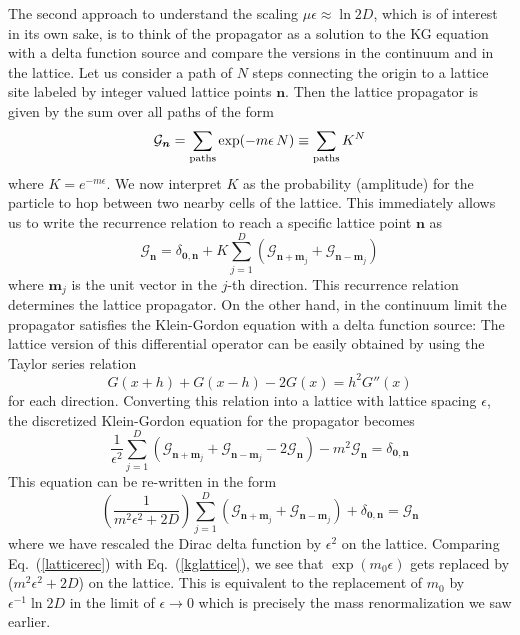 \documentclass[12pt]{article}
\def\eq#1{{Eq.~(\ref{#1})}}
\begin{document}
The second approach to understand the scaling $\mu\epsilon \approx \ln 2D$, which is of interest in its own sake, is to think of the propagator as a solution to the KG equation with a delta function source and compare the versions in the continuum and in the lattice.
 Let us consider a path of $N$ steps connecting the origin to a lattice site labeled by integer valued lattice points $\bm{n}$. Then the lattice propagator is given by the sum over all paths of the form
\begin{equation}
 \mathcal{G}_{\bm{n}} = \sum_{\rm paths} \exp(-m\epsilon \, N) \equiv \sum_{\rm paths} K^N
\end{equation} 
where $K = e^{-m\epsilon }$. We now interpret $K$ as the probability (amplitude) for the particle to hop between two nearby cells of the lattice. This immediately allows us to write the recurrence relation to reach a specific lattice point $\bm{n}$ as
\begin{equation}
 \mathcal{G}_{\bm{n}} = \delta_{\bm{0},\bm{n}} + K\sum_{j=1}^D  (\mathcal{G}_{\bm{n}+\bm{m}_j} + \mathcal{G}_{\bm{n}-\bm{m}_j})
 \label{latticerec}
\end{equation} 
where $\bm{m}_j$ is the unit vector in the $j$-th direction. This recurrence relation determines the lattice propagator. On the other hand, in the continuum limit the propagator satisfies the Klein-Gordon equation with a delta function source:  
The lattice version of this differential operator can be easily obtained by using the Taylor series relation 
\begin{equation}
 G(x+h) + G(x-h) - 2G(x) = h^2 G''(x)
\end{equation} 
for each direction.
Converting this relation into a lattice with lattice spacing $\epsilon$, the discretized Klein-Gordon equation for the propagator becomes
\begin{equation}
 \frac{1}{\epsilon^2} \sum_{j=1}^D  (\mathcal{G}_{\bm{n}+\bm{m}_j} + \mathcal{G}_{\bm{n}-\bm{m}_j} - 2 \mathcal{G}_{\bm{n}}) - m^2 \mathcal{G}_{\bm{n}} = \delta_{\bm{0},\bm{n}}
\end{equation} 
This equation can be re-written in the form
\begin{equation}
 \left( \frac{1}{m^2\epsilon^2 +2D}\right) \sum_{j=1}^D  (\mathcal{G}_{\bm{n}+\bm{m}_j} + \mathcal{G}_{\bm{n}-\bm{m}_j}) + \delta_{\bm{0},\bm{n}} = \mathcal{G}_{\bm{n}}
 \label{kglattice}
\end{equation} 
where we have rescaled the Dirac delta function by $\epsilon^2$ on the lattice. Comparing \eq{latticerec} with \eq{kglattice}, we see that $\exp(m_0 \epsilon)$ gets replaced by ($m^2 \epsilon^2 + 2D$) on the lattice. This is equivalent to the replacement of $m_0$ by $\epsilon^{-1}\ln 2D$ in the limit of $\epsilon \to 0$ which is precisely the mass renormalization we saw earlier. 
\end{document}
